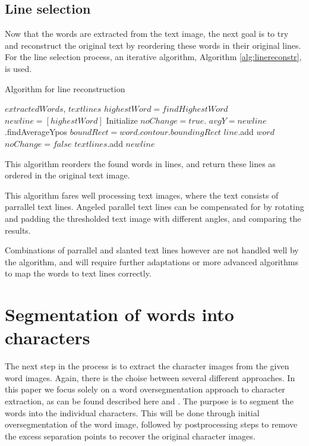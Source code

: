 \documentclass{article}
\begin{document}
\subsection{Line selection}
Now that the words are extracted from the text image, the next goal is to try and reconstruct the original text by reordering these words in their original lines.
For the line selection process, an iterative algorithm, Algorithm \ref{alg:linereconstr}, is used.
\begin{algorithm}[tb]
   \caption{Algorithm for line reconstruction}
   \label{alg:linereconstr}
\begin{algorithmic}
    $extractedWords$, $textlines$
   \REPEAT
        \STATE $highestWord = findHighestWord $
        \STATE $newline = [highestWord]$
        \STATE Initialize $noChange = true$.
        \STATE $avgY= newline$.findAverageYpos
        \REPEAT
            \STATE $boundRect = word.contour.boundingRect$
            \STATE $line$.add $word$
            \STATE $noChange = false$
            \ENDIF
        \ENDFOR
        \STATE $textlines$.add $newline$
\end{algorithmic}
\end{algorithm}

This algorithm reorders the found words in lines, and return these lines as ordered in the original text image.

This algorithm fares well processing text images, where the text consists of parrallel text lines.
Angeled parallel text lines can be compensated for by rotating and padding the thresholded text image with different angles, and comparing the results.

Combinations of parrallel and slanted text lines however are not handled well by the algorithm, and will require further adaptations or more advanced algorithms to map the words to text lines correctly.


\section{Segmentation of words into characters}
\label{sec:segword}

The next step in the process is to extract the character images from the given word images.
Again, there is the choise between several different approaches.
In this paper we focus solely on a word oversegmentation approach to character extraction, as can be found described here \cite{CharSegm} and \cite{CharSegmOld}.
The purpose is to segment the words into the individual characters.
This will be done through initial oversegmentation of the word image, followed by postprocessing steps to remove the excess separation points to recover the original character images.
\end{document}
